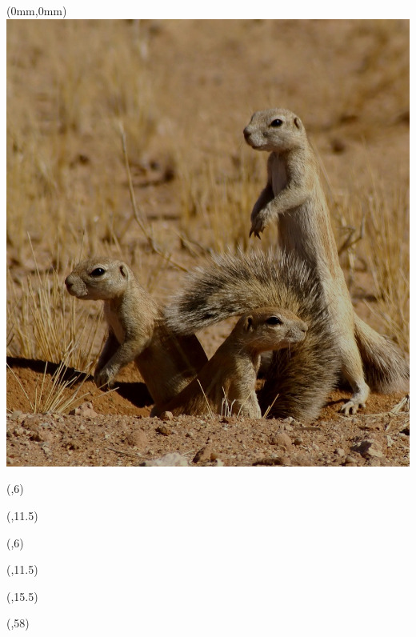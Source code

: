 \begin{textblock*}{\paperwidth}(0mm,0mm)
  \includegraphics[width=\paperwidth,%
                   keepaspectratio=true]{images/Xerus_inauris_1}
\end{textblock*}

\begin{textblock*}{\textwidth}(\TPHorizModule,6\TPVertModule)
  \textcolor{black!5}{\titlefmt}
\end{textblock*}

\begin{textblock*}{\textwidth}(\TPHorizModule,11.5\TPVertModule)
  \textcolor{black!5}{\authorfmt}
\end{textblock*}

\null\cleardoublepage


\begin{textblock*}{\textwidth}(\TPHorizModule,6\TPVertModule)
  \titlefmt
\end{textblock*}

\begin{textblock*}{\textwidth}(\TPHorizModule,11.5\TPVertModule)
  \authorfmt
\end{textblock*}

\begin{textblock*}{\textwidth}(\TPHorizModule,15.5\TPVertModule)
  \affiliation
\end{textblock*}

\begin{textblock*}{\textwidth}(\TPHorizModule,58\TPVertModule)
  \edition
\end{textblock*}
\endgroup


